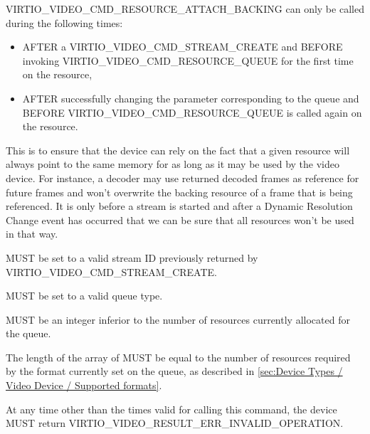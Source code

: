 VIRTIO\_VIDEO\_CMD\_RESOURCE\_ATTACH\_BACKING can only be called during
the following times:

\begin{itemize}
\item
  AFTER a VIRTIO\_VIDEO\_CMD\_STREAM\_CREATE and BEFORE invoking
  VIRTIO\_VIDEO\_CMD\_RESOURCE\_QUEUE for the first time on the
  resource,
\item
  AFTER successfully changing the 
  parameter corresponding to the queue and BEFORE
  VIRTIO\_VIDEO\_CMD\_RESOURCE\_QUEUE is called again on the resource.
\end{itemize}

This is to ensure that the device can rely on the fact that a given
resource will always point to the same memory for as long as it may be
used by the video device. For instance, a decoder may use returned
decoded frames as reference for future frames and won't overwrite the
backing resource of a frame that is being referenced. It is only before
a stream is started and after a Dynamic Resolution Change event has
occurred that we can be sure that all resources won't be used in that
way.


 MUST be set to a valid stream ID previously returned
by VIRTIO\_VIDEO\_CMD\_STREAM\_CREATE.

 MUST be set to a valid queue type.

 MUST be an integer inferior to the number of
resources currently allocated for the queue.

The length of the  array of
 MUST be equal to the
number of resources required by the format currently set on the queue,
as described in
\ref{sec:Device Types / Video Device / Supported formats}.


At any time other than the times valid for calling this command, the
device MUST return VIRTIO\_VIDEO\_RESULT\_ERR\_INVALID\_OPERATION.

